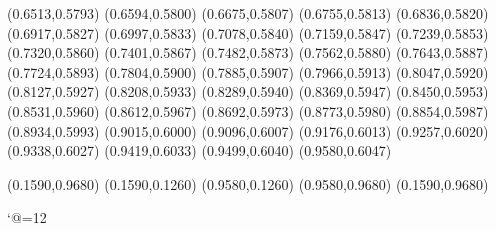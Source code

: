 (0.6513,0.5793)             
(0.6594,0.5800)             
(0.6675,0.5807)             
(0.6755,0.5813)             
(0.6836,0.5820)             
(0.6917,0.5827)             
(0.6997,0.5833)             
(0.7078,0.5840)             
(0.7159,0.5847)             
(0.7239,0.5853)             
(0.7320,0.5860)             
(0.7401,0.5867)             
(0.7482,0.5873)             
(0.7562,0.5880)             
(0.7643,0.5887)             
(0.7724,0.5893)             
(0.7804,0.5900)
(0.7885,0.5907)
(0.7966,0.5913)
(0.8047,0.5920)
(0.8127,0.5927)
(0.8208,0.5933)
(0.8289,0.5940)
(0.8369,0.5947)
(0.8450,0.5953)
(0.8531,0.5960)
(0.8612,0.5967)
(0.8692,0.5973)
(0.8773,0.5980)
(0.8854,0.5987)
(0.8934,0.5993)
(0.9015,0.6000)
(0.9096,0.6007)
(0.9176,0.6013)
(0.9257,0.6020)
(0.9338,0.6027)
(0.9419,0.6033)
(0.9499,0.6040)
(0.9580,0.6047)

\PST@Border(0.1590,0.9680)
(0.1590,0.1260)
(0.9580,0.1260)
(0.9580,0.9680)
(0.1590,0.9680)

\catcode`@=12
\fi
\endpspicture
